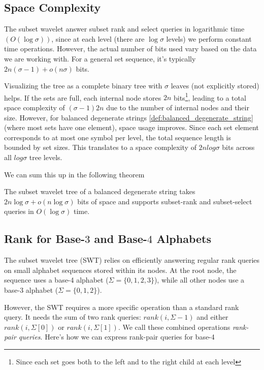 \subsection*{Space Complexity}
The subset wavelet answer subset rank and select queries in logarithmic time $(O(\log \sigma))$, since at each level (there are $\log \sigma$ levels) we perform constant time operations. However, the actual number of bits used vary based on the data we are working with. For a general set sequence, it's typically $2n(\sigma - 1) + o(n\sigma)$ bits. \vspace{0.4cm}

\noindent Visualizing the tree as a complete binary tree with $\sigma$ leaves (not explicitly stored) helps. If the sets are full, each internal node stores $2n$ bits\footnote{Since each set goes both to the left and to the right child at each level}, leading to a total space complexity of $(\sigma - 1)2n$ due to the number of internal nodes and their size. However, for balanced degenerate strings \ref{def:balanced_degenerate_string} (where most sets have one element), space usage improves. Since each set element corresponds to at most one symbol per level, the total sequence length is bounded by set sizes. This translates to a space complexity of $2n log \sigma$ bits across all $log \sigma$ tree levels. \vspace{0.4cm}

\noindent We can sum this up in the following theorem

\begin{theorem} \label{thm:swt_space}
    The subset wavelet tree of a balanced degenerate string takes $2n \log \sigma + o(n \log \sigma)$ bits of space and supports subset-rank and subset-select queries in $O(\log \sigma)$ time.
\end{theorem}

\subsection*{Rank for Base-$3$ and Base-$4$ Alphabets}

The subset wavelet tree (SWT) relies on efficiently answering regular rank queries on small alphabet sequences stored within its nodes. At the root node, the sequence uses a base-4 alphabet ($\Sigma = \{0, 1, 2, 3\}$), while all other nodes use a base-3 alphabet ($\Sigma = \{0, 1, 2\}$). \vspace{0.4cm}

\noindent However, the SWT requires a more specific operation than a standard rank query. It needs the sum of two rank queries: $rank(i, \Sigma - 1)$ and either $rank(i, \Sigma[0])$ or $rank(i, \Sigma[1])$. We call these combined operations \emph{rank-pair queries}. Here's how we can express rank-pair queries for base-4

